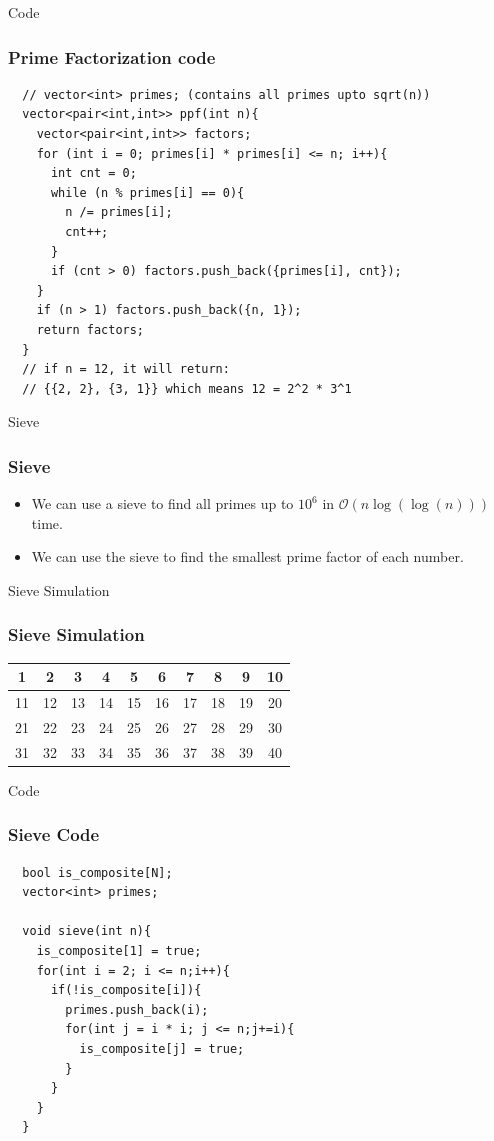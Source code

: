 \documentclass{beamer}
\begin{document}
\begin{frame}[fragile]{Code}
  \frametitle{Prime Factorization code}
  \begin{verbatim}
  // vector<int> primes; (contains all primes upto sqrt(n))
  vector<pair<int,int>> ppf(int n){
    vector<pair<int,int>> factors;
    for (int i = 0; primes[i] * primes[i] <= n; i++){
      int cnt = 0;
      while (n % primes[i] == 0){
        n /= primes[i];
        cnt++;
      }
      if (cnt > 0) factors.push_back({primes[i], cnt});
    }
    if (n > 1) factors.push_back({n, 1});
    return factors;
  }
  // if n = 12, it will return:
  // {{2, 2}, {3, 1}} which means 12 = 2^2 * 3^1 
  \end{verbatim}
\end{frame}

\begin{frame}[fragile]{Sieve}
  \frametitle{Sieve}
  \begin{itemize}
    \item<1-> We can use a sieve to find all primes up to $10^6$ in $\mathcal{O}(n \log(\log(n)))$ time.
    \item<2-> We can use the sieve to find the smallest prime factor of each number.
  \end{itemize}
\end{frame}

\begin{frame}[fragile]{Sieve Simulation}
  \frametitle{Sieve Simulation}
  
\begin{center}
\begin{tabular}{|*{10}{c|}}
\hline
1 & 2 & 3 & 4 & 5 & 6 & 7 & 8 & 9 & 10 \\
\hline
11 & 12 & 13 & 14 & 15 & 16 & 17 & 18 & 19 & 20 \\
\hline
21 & 22 & 23 & 24 & 25 & 26 & 27 & 28 & 29 & 30 \\
\hline
31 & 32 & 33 & 34 & 35 & 36 & 37 & 38 & 39 & 40 \\
\hline
\end{tabular}
\end{center}
\end{frame}

\begin{frame}[fragile]{Code}
  \frametitle{Sieve Code}
  \begin{verbatim}
  bool is_composite[N];
  vector<int> primes;

  void sieve(int n){
    is_composite[1] = true;
    for(int i = 2; i <= n;i++){
      if(!is_composite[i]){
        primes.push_back(i);
        for(int j = i * i; j <= n;j+=i){
          is_composite[j] = true;
        }
      }
    }
  }
\end{verbatim}
\end{frame}
\end{document}
